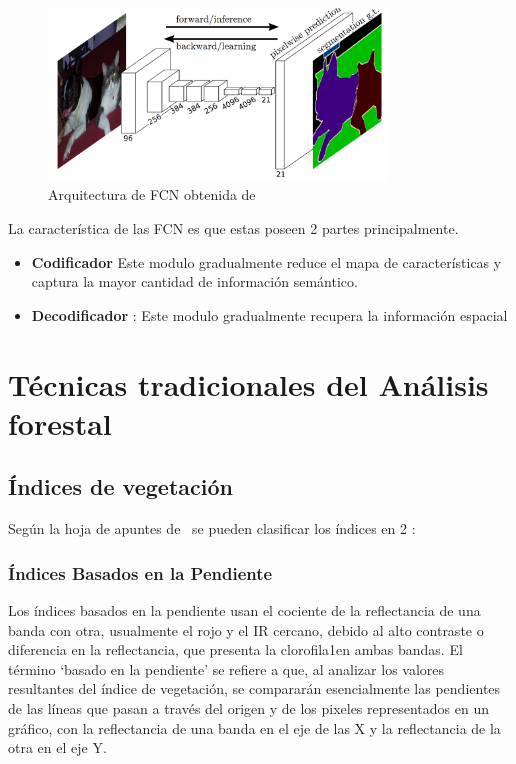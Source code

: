 \begin{figure}[H]
    \centering
    \includegraphics[width = 0.8\textwidth]{images/cat_segmentation.png}
    \caption{Arquitectura de \gls{FCN} obtenida de \cite{long2015fully}}
    \label{fig:my_label}
\end{figure}
La característica de las \gls{FCN} es que estas poseen 2 partes principalmente.
\begin{itemize}
        \item \textbf{Codificador} Este modulo gradualmente reduce el mapa de características y captura la mayor cantidad de información semántico.
        \item \textbf{Decodificador} : Este modulo gradualmente recupera la información espacial 
    \end{itemize}{}
    
    

\section{Técnicas tradicionales del Análisis forestal}
\subsection{Índices de vegetación }
Según la hoja de apuntes de~\cite{munoz2017apuntes} se pueden clasificar los índices en 2 :
\subsubsection{Índices Basados en la Pendiente}
Los índices basados en la pendiente usan el cociente de la reflectancia de una banda con otra, usualmente el rojo y el \gls{IR} cercano, debido al alto contraste o diferencia en la reflectancia, que presenta la clorofila1en ambas bandas. El término ‘basado en la pendiente’ se refiere a que, al analizar los valores resultantes del índice de vegetación, se compararán esencialmente las pendientes de las líneas que pasan a través del origen y de los pixeles representados en un gráfico, con la reflectancia de una banda en el eje de las X y la reflectancia de la otra en el eje Y.


